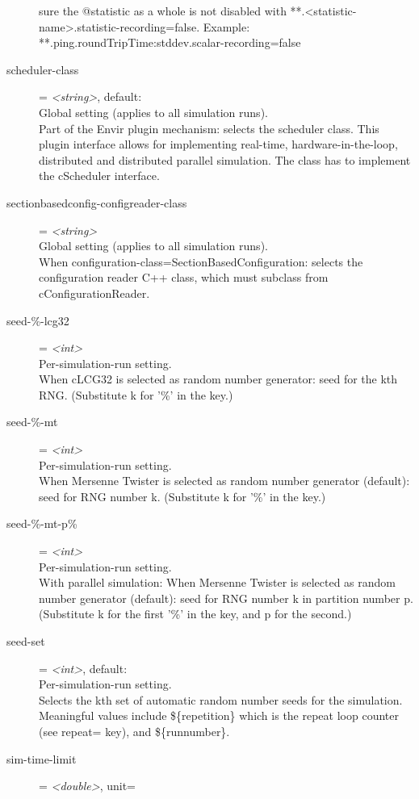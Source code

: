 \begin{description}
    sure the @statistic as a whole is not disabled with
    **.<statistic-name>.statistic-recording=false. Example:
    **.ping.roundTripTime:stddev.scalar-recording=false
\item[scheduler-class] = \textit{<string>}, default: \\
    Global setting (applies to all simulation runs).\\
    Part of the Envir plugin mechanism: selects the scheduler class. This
    plugin interface allows for implementing real-time, hardware-in-the-loop,
    distributed and distributed parallel simulation. The class has to implement
    the cScheduler interface.
\item[sectionbasedconfig-configreader-class] = \textit{<string>}\\
    Global setting (applies to all simulation runs).\\
    When configuration-class=SectionBasedConfiguration: selects the
    configuration reader C++ class, which must subclass from
    cConfigurationReader.
\item[seed-\%-lcg32] = \textit{<int>}\\
    Per-simulation-run setting.\\
    When cLCG32 is selected as random number generator: seed for the kth RNG.
    (Substitute k for '\%' in the key.)
\item[seed-\%-mt] = \textit{<int>}\\
    Per-simulation-run setting.\\
    When Mersenne Twister is selected as random number generator (default):
    seed for RNG number k. (Substitute k for '\%' in the key.)
\item[seed-\%-mt-p\%] = \textit{<int>}\\
    Per-simulation-run setting.\\
    With parallel simulation: When Mersenne Twister is selected as random
    number generator (default): seed for RNG number k in partition number p.
    (Substitute k for the first '\%' in the key, and p for the second.)
\item[seed-set] = \textit{<int>}, default: \\
    Per-simulation-run setting.\\
    Selects the kth set of automatic random number seeds for the simulation.
    Meaningful values include \$\{repetition\} which is the repeat loop counter
    (see repeat= key), and \$\{runnumber\}.
\item[sim-time-limit] = \textit{<double>}, unit=\\

\end{description}
